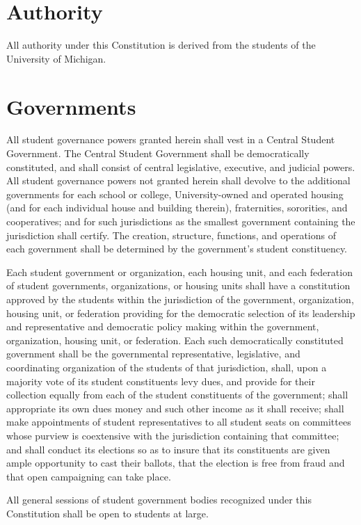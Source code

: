 \section{Authority}
    All authority under this Constitution is derived from the students of the University of Michigan.

\section{Governments}
    All student governance powers granted herein shall vest in a Central Student Government. The Central Student Government shall be democratically constituted, and shall consist of central legislative, executive, and judicial powers. All student governance powers not granted herein shall devolve to the additional governments for each school or college, University-owned and operated housing (and for each individual house and building therein), fraternities, sororities, and cooperatives; and for such jurisdictions as the smallest government containing the jurisdiction shall certify. The creation, structure, functions, and operations of each government shall be determined by the government's student constituency.

    Each student government or organization, each housing unit, and each federation of student governments, organizations, or housing units shall have a constitution approved by the students within the jurisdiction of the government, organization, housing unit, or federation providing for the democratic selection of its leadership and representative and democratic policy making within the government, organization, housing unit, or federation. Each such democratically constituted government shall be the governmental representative, legislative, and coordinating organization of the students of that jurisdiction, shall, upon a majority vote of its student constituents levy dues, and provide for their collection equally from each of the student constituents of the government; shall appropriate its own dues money and such other income as it shall receive; shall make appointments of student representatives to all student seats on committees whose purview is coextensive with the jurisdiction containing that committee; and  shall conduct its elections so as to insure that its constituents are given ample opportunity to cast their ballots, that the election is free from fraud and that open campaigning can take place.

    All general sessions of student government bodies recognized under this Constitution shall be open to students at large.

